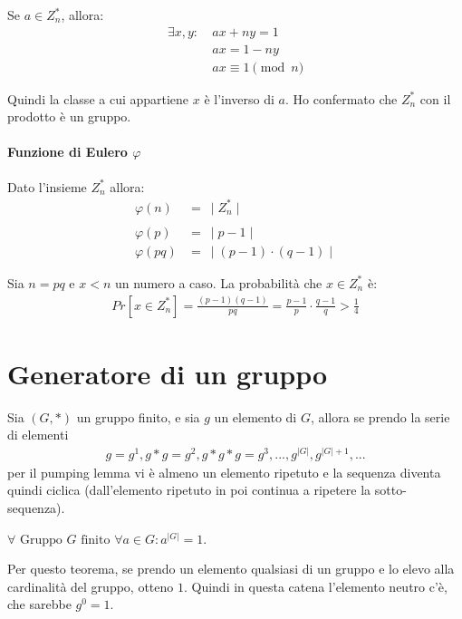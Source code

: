 \noindent Se $a \in Z^*_n$, allora:
\begin{align*}
     \exists x, y : \ &ax + ny = 1\\
                    &ax = 1 - ny\\
                    &ax \equiv 1 \pmod n
\end{align*}

\noindent Quindi la classe a cui appartiene $x$ è l'inverso di $a$. Ho confermato che $Z^*_n$ con il prodotto è un gruppo.

\paragraph{Funzione di Eulero $\varphi$} Dato l'insieme $Z_n^*$ allora:
\begin{align*}
    \varphi(n) &= \ \mid Z_n^* \mid \\\\
    \varphi(p) &= \ \mid p-1 \mid \\
    \varphi(pq) &= \ \mid (p-1) \cdot (q-1) \mid
\end{align*}

\noindent Sia $n = pq$ e $x<n$ un numero a caso. La probabilità che $x \in Z_n^*$ è:
\begin{align*}
    Pr[x \in Z_n^*] = \frac{(p-1)(q-1)}{pq} = \frac{p-1}{p} \cdot \frac{q-1}{q} > \frac{1}{4}
\end{align*}

\section{Generatore di un gruppo}
Sia $(G, *)$ un gruppo finito, e sia $g$ un elemento di $G$, allora se prendo la serie di elementi
\begin{align*}
    g = g^1, g*g=g^2, g*g*g=g^3, ..., g^{|G|}, g^{|G|+1}, ...
\end{align*}
\noindent per il pumping lemma vi è almeno un elemento ripetuto e la sequenza diventa quindi ciclica (dall'elemento ripetuto in poi continua a ripetere la sotto-sequenza).

\begin{theorem}
    \(\forall \text{ Gruppo } G \text{ finito } \forall a \in G : a^{|G|} = 1\).
\end{theorem}

\noindent Per questo teorema, se prendo un elemento qualsiasi di un gruppo e lo elevo alla cardinalità del gruppo, otteno $1$. Quindi in questa catena l'elemento neutro c'è, che sarebbe $g^0 = 1$.

